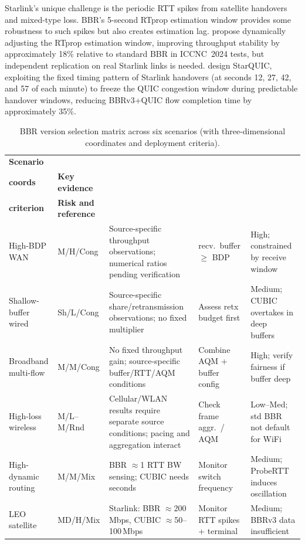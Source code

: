 \documentclass[a4paper,fleqn]{cas-sc}
\begin{document}
Starlink's unique challenge is the periodic RTT spikes from satellite handovers
and mixed-type loss. BBR's 5-second RTprop estimation window provides some
robustness to such spikes but also creates estimation lag. \citet{wang2024bbr_leo}
propose dynamically adjusting the RTprop estimation window, improving throughput
stability by approximately 18\% relative to standard BBR in ICCNC~2024 tests, but
independent replication on real Starlink links is needed. \citet{kamel2024starquic}
design StarQUIC, exploiting the fixed timing pattern of Starlink handovers (at
seconds 12, 27, 42, and 57 of each minute) to freeze the QUIC congestion window
during predictable handover windows, reducing BBRv3+QUIC flow completion time by
approximately 35\%.

\begin{table}[pos=htbp]
  \caption{BBR version selection matrix across six scenarios
    (with three-dimensional coordinates and deployment criteria).}
  \label{tab:summary}
  \small
  \small
  \begin{tabularx}{\tblwidth}{@{}p{2.0cm}p{1.5cm}Xp{2.0cm}X@{}}
    \toprule
    \textbf{Scenario} & \makecell[l]{\textbf{3-D}\\\textbf{coords}} & \textbf{Key evidence}
      & \makecell[l]{\textbf{Deployment}\\\textbf{criterion}} & \textbf{Risk and reference} \\
    \midrule
    High-BDP WAN & M/H/Cong & Source-specific throughput observations; numerical ratios pending verification &
      recv.\ buffer $\geq$ BDP & High; constrained by receive window~\citep{cardwell2017bbr} \\
    \midrule
    Shallow-buffer wired & Sh/L/Cong & Source-specific share/retransmission observations; no fixed multiplier &
      Assess retx budget first & Medium; CUBIC overtakes in deep buffers~\citep{cao2019bbr,jaeger2019bbr} \\
    \midrule
    Broadband multi-flow & M/M/Cong & No fixed throughput gain; source-specific buffer/RTT/AQM conditions &
      Combine AQM + buffer config & High; verify fairness if buffer deep~\citep{gomez2024bbrv3} \\
    \midrule
    High-loss wireless & M/L--M/Rnd & Cellular/WLAN results require separate source conditions; pacing and aggregation interact &
      Check frame aggr.\ / AQM & Low--Med; std BBR not default for WiFi~\citep{atxutegi2018cellular,grazia2020bbrp} \\
    \midrule
    High-dynamic routing & M/M/Mix & BBR $\approx$1 RTT BW sensing; CUBIC needs seconds &
      Monitor switch frequency & Medium; ProbeRTT induces oscillation~\citep{miyazawa2018cyclic} \\
    \midrule
    LEO satellite & MD/H/Mix & Starlink: BBR $\approx$200\,Mbps, CUBIC $\approx$50--100\,Mbps &
      Monitor RTT spikes + terminal & Medium; BBRv3 data insufficient~\citep{deutschmann2023starlink,kamel2024starquic} \\
    \bottomrule
  \end{tabularx}
\end{table}
\end{document}
